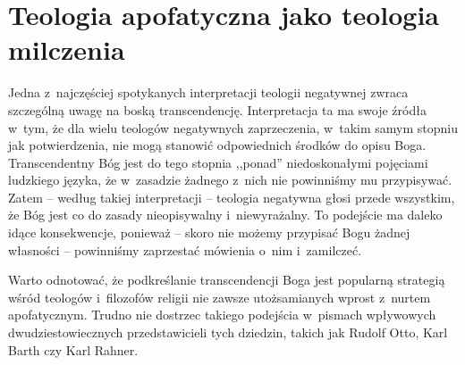 

\chapter{Teologia apofatyczna jako teologia milczenia}\label{sil-general}



Jedna z~najczęściej spotykanych interpretacji teologii negatywnej zwraca szczególną uwagę na boską transcendencję. Interpretacja ta ma swoje źródła w~tym, że dla wielu teologów negatywnych zaprzeczenia, w~takim samym stopniu jak potwierdzenia, nie mogą stanowić odpowiednich środków do opisu Boga. Transcendentny Bóg jest do tego stopnia ,,ponad'' niedoskonałymi pojęciami ludzkiego języka, że w~zasadzie żadnego z~nich nie powinniśmy mu przypisywać. Zatem -- według takiej interpretacji -- teologia negatywna głosi przede wszystkim, że Bóg jest co do zasady nieopisywalny i~niewyrażalny. To podejście ma daleko idące konsekwencje, ponieważ -- skoro nie możemy przypisać Bogu żadnej własności -- powinniśmy zaprzestać mówienia o~nim i~zamilczeć.


Warto odnotować, że podkreślanie transcendencji Boga jest popularną strategią wśród teologów i~filozofów religii nie zawsze utożsamianych wprost z~nurtem apofatycznym. Trudno nie dostrzec takiego podejścia w~pismach wpływowych dwudziestowiecznych przedstawicieli tych dziedzin, takich jak Rudolf Otto, Karl Barth czy Karl Rahner.

